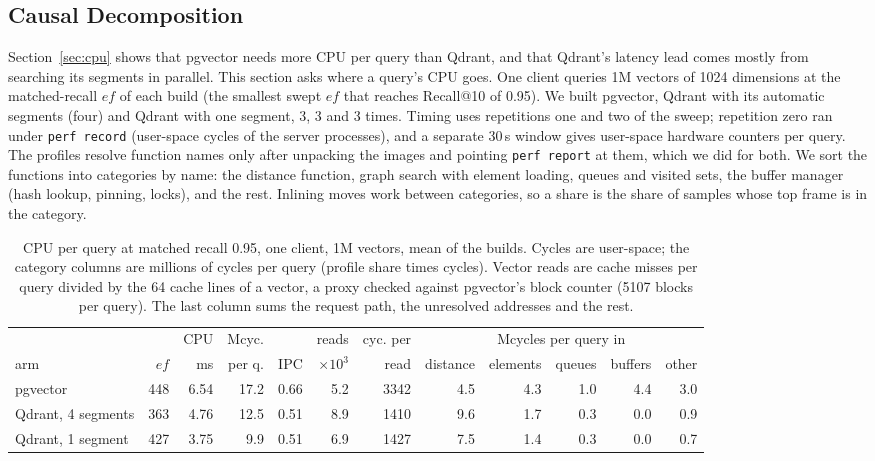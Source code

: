 \documentclass[preprint,12pt]{elsarticle}
\begin{document}
\subsection{Causal Decomposition}
\label{sec:causal}

Section~\ref{sec:cpu} shows that pgvector needs more CPU per query than Qdrant, and that Qdrant's
latency lead comes mostly from searching its segments in parallel. This section asks where a query's
CPU goes. One client queries 1M vectors of 1024 dimensions at the matched-recall $ef$ of each build (the
smallest swept $ef$ that reaches Recall@10 of 0.95). We built pgvector, Qdrant with its automatic segments
(four) and Qdrant with one segment, 3, 3 and 3 times. Timing uses repetitions one and two of the sweep; repetition
zero ran under \texttt{perf record} (user-space cycles of the server processes), and a separate
30\,s window gives user-space hardware counters per query. The profiles resolve function names only
after unpacking the images and pointing \texttt{perf report} at them, which we did for both. We sort the
functions into categories by name: the distance function, graph search with element loading, queues and
visited sets, the buffer manager (hash lookup, pinning, locks), and the rest. Inlining moves work between
categories, so a share is the share of samples whose top frame is in the category.

\begin{table}[t]
  \caption{CPU per query at matched recall 0.95, one client, 1M vectors, mean of the builds.
  Cycles are user-space; the category columns are millions of cycles per query (profile share times
  cycles). Vector reads are cache misses per query divided by the 64 cache lines of a vector, a proxy
  checked against pgvector's block counter (5107 blocks per query). The last column sums the request path,
  the unresolved addresses and the rest.}
  \label{tab:causal}
  \small
  \begin{tabular}{@{}lrrrrrrrrrrr@{}}
    \toprule
    & & CPU & Mcyc. & & reads & cyc. per & \multicolumn{5}{c}{Mcycles per query in} \\
    arm & $ef$ & ms & per q. & IPC & $\times10^3$ & read & distance & elements & queues & buffers & other \\
    \midrule
    pgvector & 448 & 6.54 & 17.2 & 0.66 & 5.2 & 3342 & 4.5 & 4.3 & 1.0 & 4.4 & 3.0 \\
    Qdrant, 4 segments & 363 & 4.76 & 12.5 & 0.51 & 8.9 & 1410 & 9.6 & 1.7 & 0.3 & 0.0 & 0.9 \\
    Qdrant, 1 segment & 427 & 3.75 & 9.9 & 0.51 & 6.9 & 1427 & 7.5 & 1.4 & 0.3 & 0.0 & 0.7 \\
    \bottomrule
  \end{tabular}
\end{table}
\end{document}
